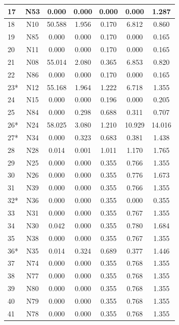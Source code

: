 \documentclass[10p]{article}
\theoremstyle{definition}
\theoremstyle{definition}
\begin{document}
\begin{appendices}
\begin{table}[!ht]
\begin{tabular}{lcccccc}
 \hline
 17 & N53 & 0.000 & 0.000&  0.000& 0.000 & 1.287 \\
 \hline
 18 &  N10 & 50.588 & 1.956 &0.170 & 6.812 & 0.860\\
 \hline
 19 & N85 & 0.000 & 0.000 & 0.170 & 0.000 & 0.165\\
 \hline
 20 & N11 & 0.000 & 0.000 & 0.170 &0.000 & 0.165 \\
 \hline
 21 & N08 & 55.014 & 2.080 & 0.365 & 6.853 & 0.820 \\
 \hline
 22 & N86 & 0.000 & 0.000 & 0.170 &0.000 &0.165 \\
 \hline
 23* & N12 & 55.168 & 1.964 &1.222 & 6.718 &1.355 \\
 \hline
 24 & N15 & 0.000 & 0.000&0.196& 0.000 &0.205 \\
 \hline
 25 & N84 & 0.000 & 0.298 & 0.688 & 0.311 &  0.707\\
 \hline
 26* & N24 & 58.025 & 3.080& 1.210& 10.929 & 14.016 \\
 \hline
 27* & N34 & 0.000 & 0.323& 0.683 & 0.381 & 1.438\\
 \hline
 28 & N28 & 0.014 & 0.001& 1.011 & 1.170 & 1.765\\
 \hline
 29 & N25 & 0.000 & 0.000&0.355 & 0.766 & 1.355 \\
 \hline
 30 & N26 & 0.000 & 0.000&0.355 & 0.776 & 1.673 \\
 \hline
 31 & N39 & 0.000 & 0.000&0.355 & 0.766 & 1.355 \\
 \hline
 32* & N36 & 0.000 & 0.000& 0.355& 0.000 &0.355 \\
 \hline
 33 & N31 & 0.000 & 0.000& 0.355& 0.767 & 1.355 \\
 \hline
 34 & N30 & 0.042 & 0.000 &0.355 & 0.780 &1.684 \\
 \hline
 35 & N38 & 0.000  & 0.000&0.355 &0.767 & 1.355\\
 \hline
 36* & N35 &0.014 & 0.324&0.689 & 0.377 & 1.446 \\
 \hline
 37 & N74 & 0.000 & 0.000 &0.355 & 0.768 &1.355 \\
 \hline
 38 & N77 & 0.000  & 0.000& 0.355& 0.768 &1.355 \\
 \hline
 39 & N80 & 0.000 & 0.000 & 0.355&0.768 &1.355 \\
 \hline
 40 & N79 & 0.000 & 0.000& 0.355&0.768  &1.355 \\
 \hline
  41 & N78 & 0.000 & 0.000 & 0.355&0.768 &1.355 \\
 \hline
\bottomrule
\end{tabular}
\end{table}

\end{appendices}
\end{document}
